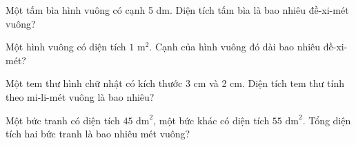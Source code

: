 \begin{ex}
Một tấm bìa hình vuông có cạnh 5 dm. Diện tích tấm bìa là bao nhiêu đề-xi-mét vuông?
\end{ex}

\begin{ex}
Một hình vuông có diện tích $1\text{ m}^2$. Cạnh của hình vuông đó dài bao nhiêu đề-xi-mét?
\end{ex}

\begin{ex}
Một tem thư hình chữ nhật có kích thước 3 cm và 2 cm. Diện tích tem thư tính theo mi-li-mét vuông là bao nhiêu?
\end{ex}

\begin{ex}
Một bức tranh có diện tích $45\text{ dm}^2$, một bức khác có diện tích $55\text{ dm}^2$. Tổng diện tích hai bức tranh là bao nhiêu mét vuông?
\end{ex}
